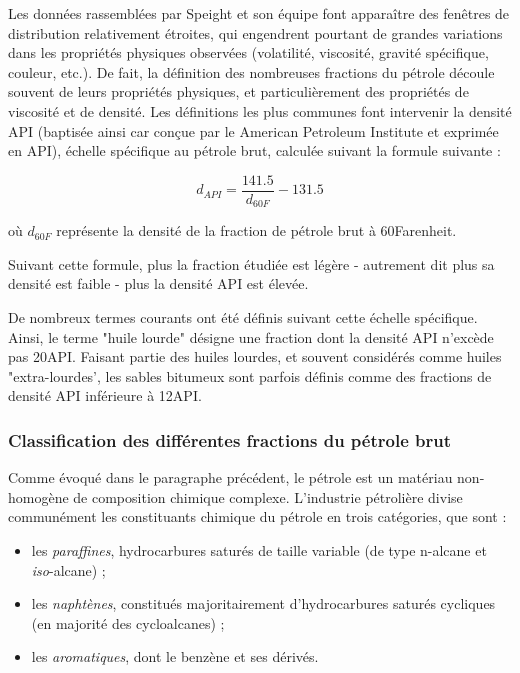 \documentclass[12pt,a4paper]{book}
\begin{document}
Les données rassemblées par Speight et son équipe font apparaître des fenêtres de distribution relativement étroites, qui engendrent pourtant de grandes variations dans les propriétés physiques observées (volatilité, viscosité, gravité spécifique, couleur, etc.). De fait, la définition des nombreuses fractions du pétrole découle souvent de leurs propriétés physiques, et particulièrement des propriétés de viscosité et de densité. Les définitions les plus communes font intervenir la densité API (baptisée ainsi car conçue par le \og American Petroleum Institute \fg{} et exprimée en \degre API), échelle spécifique au pétrole brut, calculée suivant la formule suivante : 

\begin{equation}
d_{API}=\dfrac{141.5}{d_{60F}}-131.5
\end{equation}

où $d_{60F}$ représente la densité de la fraction de pétrole brut à 60\degre Farenheit. 

Suivant cette formule, plus la fraction étudiée est légère - autrement dit plus sa densité est faible - plus la densité API est élevée. 

De nombreux termes courants ont été définis suivant cette échelle spécifique. Ainsi, le terme "huile lourde" désigne une fraction dont la densité API n'excède pas 20\degre API. Faisant partie des huiles lourdes, et souvent considérés comme huiles "extra-lourdes', les sables bitumeux sont parfois définis comme des fractions de densité API inférieure à 12\degre API. 

\subsubsection{Classification des différentes fractions du pétrole brut}

Comme évoqué dans le paragraphe précédent, le pétrole est un matériau non-homogène de composition chimique complexe. L'industrie pétrolière divise communément les constituants chimique du pétrole en trois catégories, que sont : 

\begin{itemize}
	\item les \textit{paraffines}, hydrocarbures saturés de taille variable (de type n-alcane et \textit{iso}-alcane) ;
	\item les \textit{naphtènes}, constitués majoritairement d'hydrocarbures saturés cycliques (en majorité des cycloalcanes) ;
	\item les \textit{aromatiques}, dont le benzène et ses dérivés.
\end{itemize} 
\end{document}
